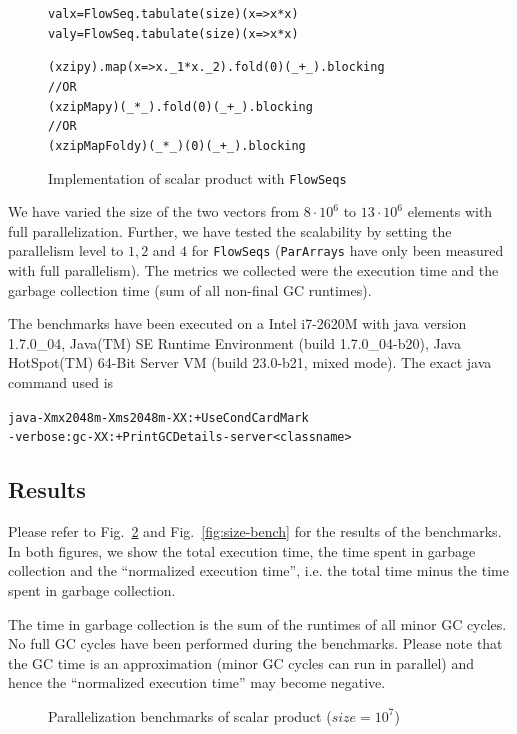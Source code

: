 \documentclass[runningheads,a4paper,fleqn]{llncs}
\begin{document}
\begin{figure}
\begin{alltt}
{\scriptsize
val x = FlowSeq.tabulate(size)(x => x*x)
val y = FlowSeq.tabulate(size)(x => x*x)

(x zip y).map(x => x._1 * x._2).fold(0)(_ + _).blocking
// OR
(x zipMap y)(_ * _).fold(0)(_ + _).blocking
// OR
(x zipMapFold y)(_ * _)(0)(_ + _).blocking
}
\end{alltt}
\caption{Implementation of scalar product with \texttt{FlowSeqs}}
\label{fig:scalar-product}
\end{figure}

We have varied the size of the two vectors from $8 \cdot 10^6$ to $13
\cdot 10^6$ elements with full parallelization. Further, we have
tested the scalability by setting the parallelism level to $1,2$ and
$4$ for \texttt{FlowSeqs} (\texttt{ParArrays} have only been measured with full
parallelism). The metrics we collected were the execution time and the
garbage collection time (sum of all non-final GC runtimes).

The benchmarks have been executed on a Intel i7-2620M with java
version 1.7.0\_04, Java(TM) SE Runtime Environment (build
1.7.0\_04-b20), Java HotSpot(TM) 64-Bit Server VM (build 23.0-b21,
mixed mode). The exact java command used is
\begin{alltt}
 java -Xmx2048m -Xms2048m -XX:+UseCondCardMark
      -verbose:gc -XX:+PrintGCDetails -server <classname>
\end{alltt}

\subsection{Results}

Please refer to Fig.~\ref{fig:par-bench} and Fig.~\ref{fig:size-bench}
for the 
results of the benchmarks. In both figures, we show the total
execution time, the time spent in garbage collection and the
``normalized execution time'', i.e. the total time minus the time
spent in garbage collection.

The time in garbage collection is the sum of the runtimes of all minor
GC cycles. No full GC cycles have been performed during the
benchmarks. Please note that the GC time is an approximation (minor GC
cycles can run in parallel) and hence the ``normalized execution
time'' may become negative.

\begin{figure}
\caption{Parallelization benchmarks of scalar product ($size = 10^7$)}
\label{fig:par-bench}
\end{figure}
\end{document}
